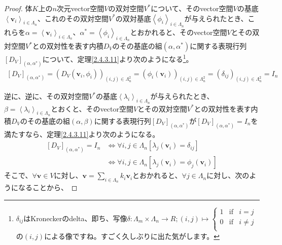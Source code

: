 \documentclass[dvipdfmx]{jsarticle}
\begin{document}
\begin{proof}
体$K$上の$n$次元vector空間$V$の双対空間$V^{*}$について、そのvector空間$V$の基底$\left\langle \mathbf{v}_{i} \right\rangle_{i \in \varLambda_{n}}$、これのその双対空間$V^{*}$の双対基底$\left\langle \phi_{i} \right\rangle_{i \in \varLambda_{n}}$が与えられたとき、これらを$\alpha = \left\langle \mathbf{v}_{i} \right\rangle_{i \in \varLambda_{n}}$、$\alpha^{*} = \left\langle \phi_{i} \right\rangle_{i \in \varLambda_{n}}$とおかれると、そのvector空間$V$とその双対空間$V^{*}$との双対性を表す内積$D_{V}$のその基底の組$\left( \alpha,\alpha^{*} \right)$に関する表現行列$\left[ D_{V} \right]_{\left( \alpha,\alpha^{*} \right)}$について、定理\ref{2.4.3.11}より次のようになる\footnote{$\delta_{ij}$はKroneckerのdelta、即ち、写像$\delta:\varLambda_{m} \times \varLambda_{n} \rightarrow R;(i,j) \mapsto \left\{ \begin{matrix}
  1 & \mathrm{if} & i = j \\
  0 & \mathrm{if} & i \neq j \\
  \end{matrix} \right.\ $の$(i,j)$による像ですね。すごく久しぶりに出た気がします。}。
\begin{align*}
\left[ D_{V} \right]_{\left( \alpha,\alpha^{*} \right)} = \left( D_{V}\left( \mathbf{v}_{i},\phi_{i} \right) \right)_{(i,j) \in \varLambda_{n}^{2}} = \left( \phi_{i}\left( \mathbf{v}_{i} \right) \right)_{(i,j) \in \varLambda_{n}^{2}} = \left( \delta_{ij} \right)_{(i,j) \in \varLambda_{n}^{2}} = I_{n}
\end{align*}\par
逆に、逆に、その双対空間$V^{*}$の基底$\left\langle \lambda_{i} \right\rangle_{i \in \varLambda_{n}}$が与えられたとき、$\beta = \left\langle \lambda_{i} \right\rangle_{i \in \varLambda_{n}}$とおくと、そのvector空間$V$とその双対空間$V^{*}$との双対性を表す内積$D_{V}$のその基底の組$(\alpha,\beta)$に関する表現行列$\left[ D_{V} \right]_{\left( \alpha,\alpha^{*} \right)}$が$\left[ D_{V} \right]_{\left( \alpha,\alpha^{*} \right)} = I_{n}$を満たすなら、定理\ref{2.4.3.11}より次のようになる。
\begin{align*}
\left[ D_{V} \right]_{\left( \alpha,\alpha^{*} \right)} = I_{n} &\Leftrightarrow \forall i,j \in \varLambda_{n}\left[ \lambda_{j}\left( \mathbf{v}_{i} \right) = \delta_{ij} \right]\\
&\Leftrightarrow \forall i,j \in \varLambda_{n}\left[ \lambda_{j}\left( \mathbf{v}_{i} \right) = \phi_{j}\left( \mathbf{v}_{i} \right) \right]
\end{align*}
そこで、$\forall\mathbf{v} \in V$に対し、$\mathbf{v} = \sum_{i \in \varLambda_{n}} {k_{i}\mathbf{v}_{i}}$とおかれると、$\forall j \in \varLambda_{n}$に対し、次のようになることから、

\end{proof}
\end{document}
